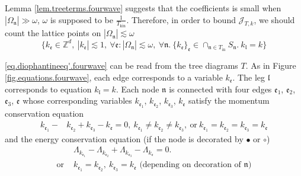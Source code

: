 Lemma \ref{lem.treeterms.fourwave} suggests that the coefficients is small when $|\Omega_{\mathfrak{n}}|\gg \omega$, $\omega$ is supposed to be $\frac{1}{T_{\text{kin}}}$. Therefore, in order to bound $\mathcal{J}_{T,k}$, we should count the lattice points on $|\Omega_{\mathfrak{n}}|\lesssim \omega$
\begin{equation}\label{eq.diophantineeq'.fourwave}
 \{k_{\mathfrak{e}}\in \mathbb{Z}^d,\ |k_{\mathfrak{e}}|\lesssim 1,\ \forall \mathfrak{e}: |\Omega_{\mathfrak{n}}|\lesssim \omega,\ \forall \mathfrak{n}. \ \{k_{\mathfrak{e}}\}_{\mathfrak{e}}\in \cap_{\mathfrak{n}\in T_{\text{in}}} S_{\mathfrak{n}}.\ k_{\mathfrak{l}}=k\}
\end{equation}


\eqref{eq.diophantineeq'.fourwave} can be read from the tree diagrams $T$. As in Figure \ref{fig.equations.fourwave}, each edge corresponds to a variable $k_{\mathfrak{e}}$. The leg $\mathfrak{l}$ corresponds to equation $k_{\mathfrak{l}}=k$. Each node $\mathfrak{n}$ is connected with four edges $\mathfrak{e}_1$, $\mathfrak{e}_2$, $\mathfrak{e}_3$, $\mathfrak{e}$ whose corresponding variables $k_{\mathfrak{e}_1}$, $k_{\mathfrak{e}_2}$, $k_{\mathfrak{e}_3}$, $k_{\mathfrak{e}}$ satisfy the momentum conservation equation
\begin{equation}
\begin{split}
k_{\mathfrak{e}_1}-&k_{\mathfrak{e}_2}+k_{\mathfrak{e}_3}-k_{\mathfrak{e}}=0,\ k_{\mathfrak{e}_1}\ne k_{\mathfrak{e}_2}\ne k_{\mathfrak{e}_3},\ \text{or}\ k_{\mathfrak{e}_1}= k_{\mathfrak{e}_2}= k_{\mathfrak{e}_3}=k_{\mathfrak{e}}
\end{split}
\end{equation}
and the energy conservation equation (if the node is decorated by $\bullet$ or $\circ$)
\begin{equation}
 \begin{split}
 &\Lambda_{k_{\mathfrak{e}_1}}-\Lambda_{k_{\mathfrak{e}_2}}+\Lambda_{k_{\mathfrak{e}_3}}-\Lambda_{k_{\mathfrak{e}}} =0.
 \\
 \text{or } &\text{$k_{\mathfrak{e}_1}=k_{\mathfrak{e}_2},\ k_{\mathfrak{e}_3}=k_{\mathfrak{e}}$ (depending on decoration of $\mathfrak{n}$)} 
 \end{split}
\end{equation}



